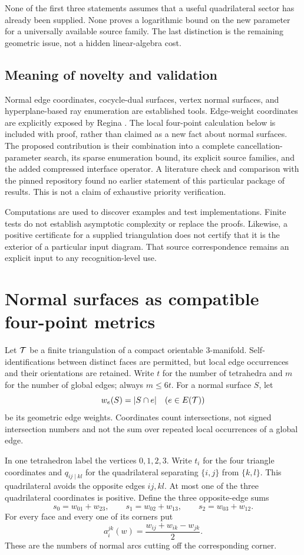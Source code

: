None of the first three statements assumes that a useful quadrilateral
sector has already been supplied. None proves a logarithmic bound on the
new parameter for a universally available source family. The last
distinction is the remaining geometric issue, not a hidden linear-algebra
cost.

\subsection{Meaning of novelty and validation}

Normal edge coordinates, cocycle-dual surfaces, vertex normal surfaces,
and hyperplane-based ray enumeration are established tools. Edge-weight
coordinates are explicitly exposed by Regina \cite{regina}. The local
four-point calculation below is included with proof, rather than claimed
as a new fact about normal surfaces. The proposed contribution is their
combination into a complete cancellation-parameter search, its sparse
enumeration bound, its explicit source families, and the added compressed
interface operator. A literature check and comparison with the pinned
repository found no earlier statement of this particular package of
results. This is not a claim of exhaustive priority verification.

Computations are used to discover examples and test implementations.
Finite tests do not establish asymptotic complexity or replace the proofs.
Likewise, a positive certificate for a supplied triangulation does not
certify that it is the exterior of a particular input diagram. That source
correspondence remains an explicit input to any recognition-level use.

\section{Normal surfaces as compatible four-point metrics}
\label{sec:weights}

Let $\mathcal T$ be a finite triangulation of a compact orientable 3-manifold.
Self-identifications between distinct faces are permitted, but local edge
occurrences and their orientations are retained. Write $t$ for the number
of tetrahedra and $m$ for the number of global edges; always $m\le6t$.
For a normal surface $S$, let
\[
               w_e(S)=|S\cap e|\quad(e\in E(\mathcal T))
\]
be its geometric edge weights. Coordinates count intersections, not signed
intersection numbers and not the sum over repeated local occurrences of
a global edge.

In one tetrahedron label the vertices $0,1,2,3$. Write $t_i$ for the four
triangle coordinates and $q_{ij\mid kl}$ for the quadrilateral separating
$\{i,j\}$ from $\{k,l\}$. This quadrilateral avoids the opposite edges
$ij,kl$. At most one of the three quadrilateral coordinates is positive.
Define the three opposite-edge sums
\[
 s_0=w_{01}+w_{23},\qquad
 s_1=w_{02}+w_{13},\qquad
 s_2=w_{03}+w_{12}.
\]
For every face and every one of its corners put
\[
                 a_i^{jk}(w)=\frac{w_{ij}+w_{ik}-w_{jk}}2.
                 \tag{1}\label{eq:arcs}
\]
These are the numbers of normal arcs cutting off the corresponding corner.

